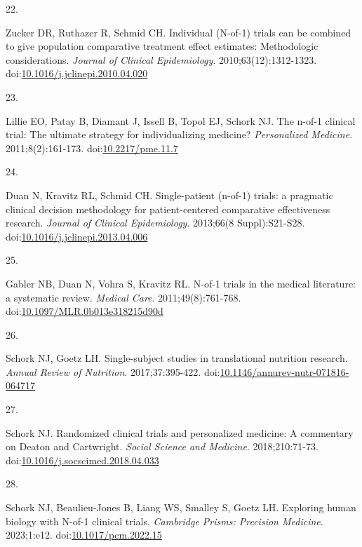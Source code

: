\documentclass[
  11pt,
]{article}
\newlength{\cslhangindent}
\newlength{\csllabelwidth}
\newenvironment{CSLReferences}[2] %
 {\begin{list}{}{%
  \setlength{\itemindent}{0pt}
  \setlength{\leftmargin}{0pt}
  \setlength{\parsep}{0pt}
  \ifodd #1
   \setlength{\leftmargin}{\cslhangindent}
   \setlength{\itemindent}{-1\cslhangindent}
  \fi
  \setlength{\itemsep}{#2\baselineskip}}}
 {\end{list}}
\newcommand{\CSLLeftMargin}[1]{\parbox[t]{\csllabelwidth}{\strut#1\strut}}
\newcommand{\CSLRightInline}[1]{\parbox[t]{\linewidth - \csllabelwidth}{\strut#1\strut}}
\begin{document}
\begin{CSLReferences}{0}{1}
\CSLLeftMargin{22. }%
\CSLRightInline{Zucker DR, Ruthazer R, Schmid CH. Individual ({N}-of-1) trials can be combined to give population comparative treatment effect estimates: Methodologic considerations. \emph{Journal of Clinical Epidemiology}. 2010;63(12):1312-1323. doi:\href{https://doi.org/10.1016/j.jclinepi.2010.04.020}{10.1016/j.jclinepi.2010.04.020}}

\CSLLeftMargin{23. }%
\CSLRightInline{Lillie EO, Patay B, Diamant J, Issell B, Topol EJ, Schork NJ. The n-of-1 clinical trial: The ultimate strategy for individualizing medicine? \emph{Personalized Medicine}. 2011;8(2):161-173. doi:\href{https://doi.org/10.2217/pme.11.7}{10.2217/pme.11.7}}

\CSLLeftMargin{24. }%
\CSLRightInline{Duan N, Kravitz RL, Schmid CH. {Single-patient (n-of-1) trials: a pragmatic clinical decision methodology for patient-centered comparative effectiveness research}. \emph{Journal of Clinical Epidemiology}. 2013;66(8 Suppl):S21-S28. doi:\href{https://doi.org/10.1016/j.jclinepi.2013.04.006}{10.1016/j.jclinepi.2013.04.006}}

\CSLLeftMargin{25. }%
\CSLRightInline{Gabler NB, Duan N, Vohra S, Kravitz RL. {N-of-1 trials in the medical literature: a systematic review}. \emph{Medical Care}. 2011;49(8):761-768. doi:\href{https://doi.org/10.1097/MLR.0b013e318215d90d}{10.1097/MLR.0b013e318215d90d}}

\CSLLeftMargin{26. }%
\CSLRightInline{Schork NJ, Goetz LH. Single-subject studies in translational nutrition research. \emph{Annual Review of Nutrition}. 2017;37:395-422. doi:\href{https://doi.org/10.1146/annurev-nutr-071816-064717}{10.1146/annurev-nutr-071816-064717}}

\CSLLeftMargin{27. }%
\CSLRightInline{Schork NJ. Randomized clinical trials and personalized medicine: A commentary on {Deaton} and {Cartwright}. \emph{Social Science and Medicine}. 2018;210:71-73. doi:\href{https://doi.org/10.1016/j.socscimed.2018.04.033}{10.1016/j.socscimed.2018.04.033}}

\CSLLeftMargin{28. }%
\CSLRightInline{Schork NJ, Beaulieu-Jones B, Liang WS, Smalley S, Goetz LH. Exploring human biology with {N}-of-1 clinical trials. \emph{Cambridge Prisms: Precision Medicine}. 2023;1:e12. doi:\href{https://doi.org/10.1017/pcm.2022.15}{10.1017/pcm.2022.15}}


\end{CSLReferences}
\end{document}
